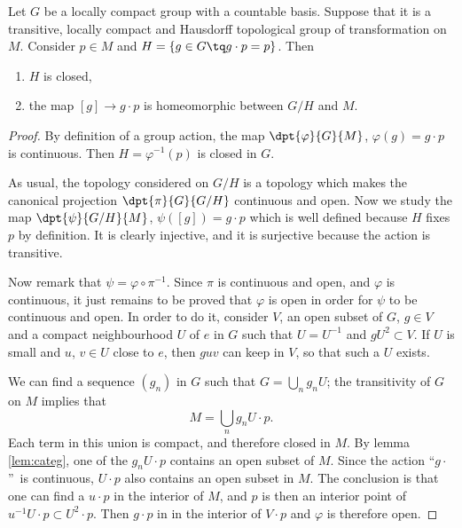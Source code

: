 \begin{theorem} \label{tho:homeo_action}
Let $G$ be a locally compact group with a countable basis. Suppose that it is a transitive, locally compact and Hausdorff topological group of transformation on $M$. Consider $p\in M$ and $H=\{g\in G\tq g\cdot p=p\}$. Then 
\begin{enumerate}
\item $H$ is closed,
\item the map $[g]\to g\cdot p$ is homeomorphic between  $G/H$ and $M$.
\end{enumerate}
\end{theorem}

\begin{proof}
By definition of a group action, the map $\dpt{\varphi}{G}{M}$, $\varphi(g)=g\cdot p$ is continuous. Then $H=\varphi^{-1}(p)$ is closed in $G$.

As usual, the topology considered on $G/H$ is a topology which makes the canonical projection $\dpt{\pi}{G}{G/H}$ continuous and open. Now we study the map $\dpt{\psi}{G/H}{M}$, $\psi([g])=g\cdot p$ which is well defined because $H$ fixes $p$ by definition. It is clearly injective, and it is surjective because the action is transitive.

Now remark that $\psi=\varphi\circ\pi^{-1}$. Since $\pi$ is continuous and open, and $\varphi$ is continuous, it just remains to be proved that $\varphi$ is open in order for $\psi$ to be continuous and open. In order to do it, consider $V$, an open subset of $G$, $g\in V$ and a compact neighbourhood $U$ of $e$ in $G$ such that $U=U^{-1}$ and $gU^2\subset V$. If $U$ is small and $u$, $v\in U$ close to $e$, then $guv$ can keep in $V$, so that such a $U$ exists.

We can find a sequence $(g_n)$ in $G$ such that $G=\bigcup_ng_nU$; the transitivity of $G$ on $M$ implies that 
\[
  M=\bigcup_ng_nU\cdot p.
\]
Each term in this union is compact, and therefore closed in $M$. By lemma \ref{lem:categ}, one of the $g_nU\cdot p$ contains an open subset of $M$. Since the action ``$g\cdot$''\ is continuous, $U\cdot p$ also contains an open subset in $M$. The conclusion is that one can find a $u\cdot p$ in the interior of $M$, and $p$ is then an interior point of $u^{-1} U\cdot p\subset U^2\cdot p$. Then $g\cdot p$ in in the interior of $V\cdot p$ and $\varphi$ is therefore open.
\end{proof}

